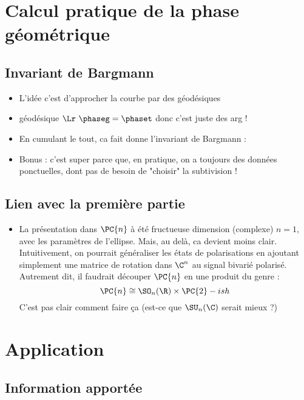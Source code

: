 

\section{Calcul pratique de la phase géométrique}

\subsection{Invariant de Bargmann}

\begin{itemize}
	\item L'idée c'est d'approcher la courbe par des géodésiques
	
	\item géodésique $\Lr\ \phaseg = \phaset$ donc c'est juste des arg !
	
	\item En cumulant le tout, ca fait donne l'invariant de Bargmann :
	
	\item Bonus : c'est super parce que, en pratique, on a toujours des données ponctuelles, dont pas de besoin de "choisir" la subtivision !
\end{itemize}



\subsection{Lien avec la première partie}

\begin{itemize}
	\item La présentation dans $\PC{n}$ à été fructueuse dimension (complexe) $n=1$, avec les paramètres de l'ellipse. Mais, au delà, ca devient moins clair. Intuitivement, on pourrait généraliser les états de polarisations en ajoutant simplement une matrice de rotation dans $\C^n$ au signal bivarié polarisé. Autrement dit, il faudrait découper $\PC{n}$ en une produit du genre :
	\[\PC{n} \cong \SO_n(\R)\times \PC{2}-ish\]
	C'est pas clair comment faire ça (est-ce que $\SU_n(\C)$ serait mieux ?)
\end{itemize}



\section{Application}

\subsection{Information apportée}

